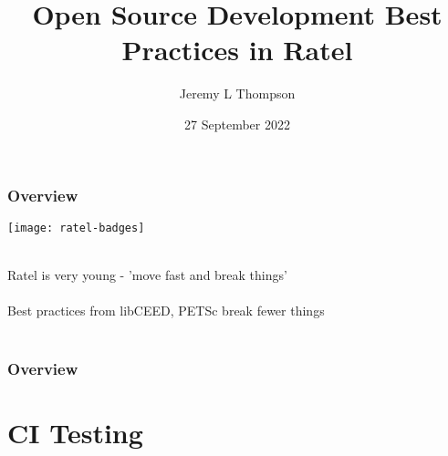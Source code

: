 \documentclass{beamer}
\title[Development Best Practices]{Open Source Development Best Practices in Ratel} %
\author{Jeremy L Thompson} %
\institute[CU Boulder] %
{University of Colorado Boulder \\ %
\medskip
\textit{jeremy@jeremylt.org} %
}
\date{27 September 2022} %
\begin{document}
\begin{frame}
\titlepage %
\end{frame}


\begin{frame}
\begin{center}
\frametitle{Overview}

\texttt{[image: ratel-badges]}

~\\

Ratel is very young - 'move fast and break things'\\

~\\

Best practices from libCEED, PETSc break fewer things\\

~\\

\end{center}
\end{frame}
 

\begin{frame}
\frametitle{Overview} %
\tableofcontents %
\end{frame}

\section{CI Testing}
\end{document}
